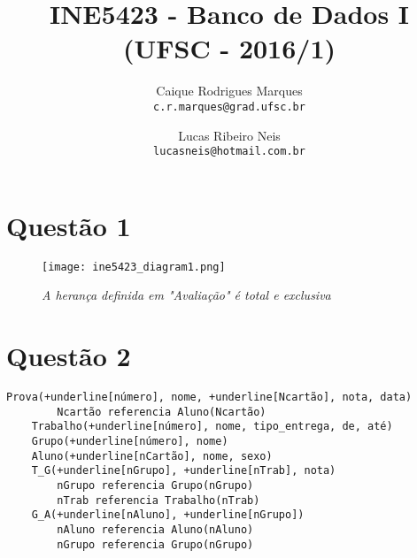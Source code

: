 \documentclass{article}
\title{\textbf{INE5423 - Banco de Dados I (UFSC - 2016/1)}}
\author{
    Caique Rodrigues Marques \\
    {\texttt{c.r.marques@grad.ufsc.br}}
    \and
    Lucas Ribeiro Neis \\
    {\texttt{lucasneis@hotmail.com.br}}
    \vspace{-5mm}
}
\date{}
\begin{document}
\maketitle

\section*{Questão 1}
    \begin{figure*}[h!]
        \centering
        \texttt{[image: ine5423\_diagram1.png]}
        \caption*{\textit{A herança definida em "Avaliação" é total e exclusiva}}
    \end{figure*}
    
\section*{Questão 2}
    \begin{Verbatim}[commandchars=+\[\]]
    Prova(+underline[número], nome, +underline[Ncartão], nota, data)
        Ncartão referencia Aluno(Ncartão)
    Trabalho(+underline[número], nome, tipo_entrega, de, até)
    Grupo(+underline[número], nome)
    Aluno(+underline[nCartão], nome, sexo)
    T_G(+underline[nGrupo], +underline[nTrab], nota)
        nGrupo referencia Grupo(nGrupo)
        nTrab referencia Trabalho(nTrab)
    G_A(+underline[nAluno], +underline[nGrupo])
        nAluno referencia Aluno(nAluno)
        nGrupo referencia Grupo(nGrupo)
    \end{Verbatim}
\end{document}
